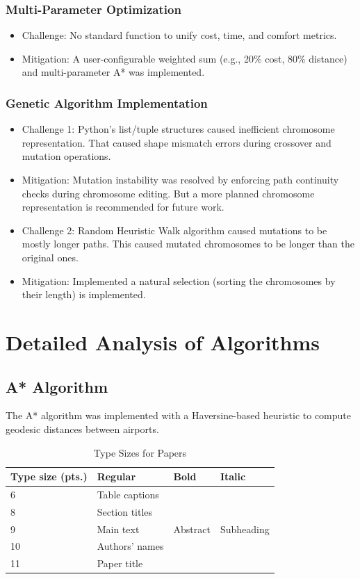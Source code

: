 \documentclass[conference]{IEEEtran}
\begin{document}
\subsubsection{Multi-Parameter Optimization}
\begin{itemize}
    \item Challenge: No standard function to unify cost, time, and comfort metrics. 
    \item Mitigation: A user-configurable weighted sum (e.g., 20\% cost, 80\% distance) and multi-parameter A* was implemented. 
\end{itemize}

\subsubsection{Genetic Algorithm Implementation}
\begin{itemize}
    \item Challenge 1: Python's list/tuple structures caused inefficient chromosome representation. That caused shape mismatch errors during crossover and mutation operations.
    \item Mitigation: Mutation instability was resolved by enforcing path continuity checks during chromosome editing. But a more planned chromosome representation is recommended for future work.
    
    \item Challenge 2: Random Heuristic Walk algorithm caused mutations to be mostly longer paths. This caused mutated chromosomes to be longer than the original ones. 
    \item Mitigation: Implemented a natural selection (sorting the chromosomes by their length) is implemented.
\end{itemize}



\section{Detailed Analysis of Algorithms}

\subsection{A* Algorithm}
The A* algorithm was implemented with a Haversine-based heuristic to compute geodesic distances between airports.


\begin{table}[ht]
\centering
\caption{Type Sizes for Papers}
\label{tab:type}
\begin{tabular}{|l|l|l|l|}
\hline
\textbf{Type size (pts.)} & \textbf{Regular} & \textbf{Bold} & \textbf{Italic} \\ \hline
6 & Table captions & & \\ \hline
8 & Section titles & & \\ \hline
9 & Main text & Abstract & Subheading \\ \hline
10 & Authors' names & & \\ \hline
11 & Paper title & & \\ \hline
\end{tabular}
\end{table}
\end{document}
